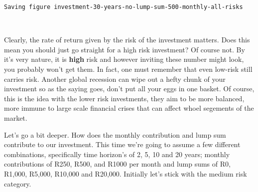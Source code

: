 \documentclass[11pt]{article}
\begin{document}
    \begin{Verbatim}[commandchars=\\\{\}]
Saving figure investment-30-years-no-lump-sum-500-monthly-all-risks

    \end{Verbatim}

    \begin{center}
    \end{center}
    { \hspace*{\fill} \\}
    
    Clearly, the rate of return given by the risk of the investment matters.
Does this mean you should just go straight for a high risk investment?
Of course not. By it's very nature, it is \textbf{high} risk and however
inviting these number might look, you probably won't get them. In fact,
one must remember that even low-risk still carries risk. Another global
recession can wipe out a hefty chunk of your investment so as the saying
goes, don't put all your eggs in one basket. Of course, this is the idea
with the lower risk investments, they aim to be more balanced, more
immune to large scale financial crises that can affect whoel segements
of the market.

Let's go a bit deeper. How does the monthly contribution and lump sum
contribute to our investment. This time we're going to assume a few
different combinations, specifically time horizon's of 2, 5, 10 and 20
years; monthly contributions of R250, R500, and R1000 per month and lump
sums of R0, R1,000, R5,000, R10,000 and R20,000. Initially let's stick
with the medium risk category.
\end{document}
